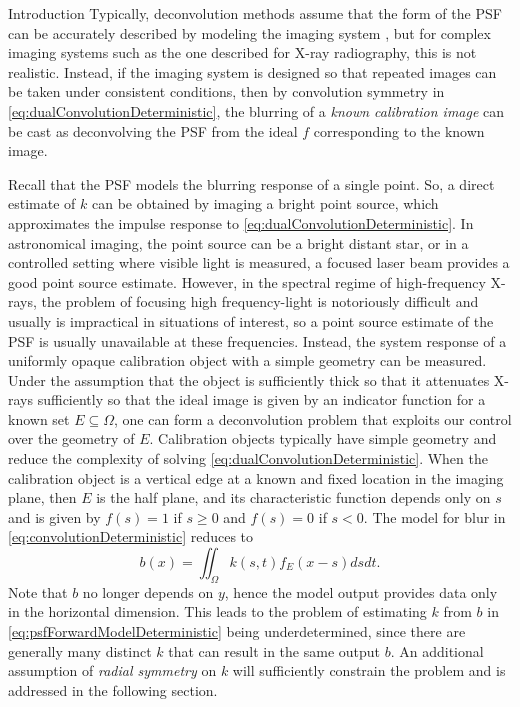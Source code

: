 \begin{chapter}{Introduction}
  Typically, deconvolution methods assume that the form of the PSF can be accurately described by modeling the imaging system \citep{jain1989,hansen2006}, but for complex imaging systems such as the one described for X-ray radiography, this is not realistic.
  Instead, if the imaging system is designed so that repeated images can be taken under consistent conditions, then by convolution symmetry in \eqref{eq:dualConvolutionDeterministic}, the blurring of a \emph{known calibration image} can be cast as deconvolving the PSF from the ideal $f$ corresponding to the known image.

  Recall that the PSF models the blurring response of a single point.
  So, a direct estimate of $k$ can be obtained by imaging a bright point source, which approximates the impulse response to \eqref{eq:dualConvolutionDeterministic}.
  In astronomical imaging, the point source can be a bright distant star, or in a controlled setting where visible light is measured, a focused laser beam provides a good point source estimate.
  However, in the spectral regime of high-frequency X-rays, the problem of focusing high frequency-light is notoriously difficult and usually is impractical in situations of interest, so a point source estimate of the PSF is usually unavailable at these frequencies.
  Instead, the system response of a uniformly opaque calibration object with a simple geometry can be measured.
  Under the assumption that the object is sufficiently thick so that it attenuates X-rays sufficiently so that the ideal image is given by an indicator function for a known set $E \subseteq \Omega$, one can form a deconvolution problem that exploits our control over the geometry of $E$.
  Calibration objects typically have simple geometry and reduce the complexity of solving \eqref{eq:dualConvolutionDeterministic}.
  When the calibration object is a vertical edge at a known and fixed location in the imaging plane, then $E$ is the half plane, and its characteristic function depends only on $s$ and is given by $f(s) = 1$ if $s\ge0$ and $f(s)=0$ if $s <0$. 
  The model for blur in \ref{eq:convolutionDeterministic} reduces to
\begin{equation}\label{eq:psfForwardModelDeterministic}
  b(x) = \iint_{\Omega} k(s,t) f_E(x-s)dsdt. 
\end{equation}
  Note that $b$ no longer depends on $y$, hence the model output provides data only in the horizontal dimension.
  This leads to the problem of estimating $k$ from $b$ in \eqref{eq:psfForwardModelDeterministic} being underdetermined, since there are generally many distinct $k$ that can result in the same output $b$.
  An additional assumption of \emph{radial symmetry} on $k$ will sufficiently constrain the problem and is addressed in the following section.


\end{chapter}
